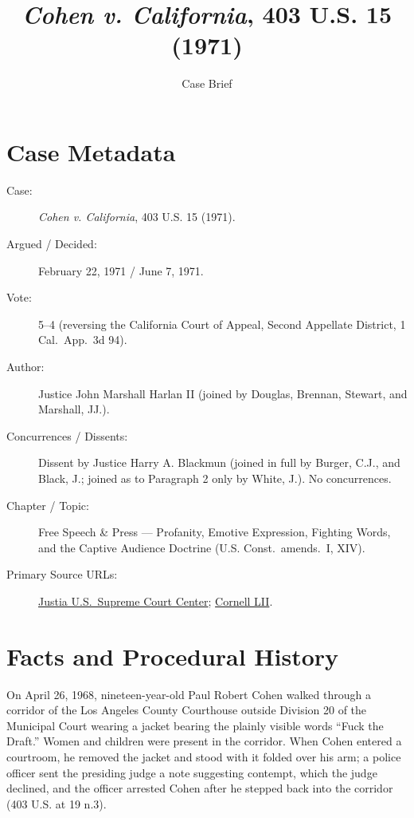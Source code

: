 \documentclass[12pt]{article}
\title{\textit{Cohen v. California}, 403 U.S. 15 (1971)}
\author{Case Brief}
\date{}
\begin{document}
\maketitle


\section{Case Metadata}
\begin{description}
  \item[Case:] \textit{Cohen v. California}, 403 U.S. 15 (1971).
  \item[Argued / Decided:] February 22, 1971 / June 7, 1971.
  \item[Vote:] 5--4 (reversing the California Court of Appeal, Second Appellate District, 1 Cal.\ App.\ 3d 94).
  \item[Author:] Justice John Marshall Harlan II (joined by Douglas, Brennan, Stewart, and Marshall, JJ.).
  \item[Concurrences / Dissents:] Dissent by Justice Harry A. Blackmun (joined in full by Burger, C.J., and Black, J.; joined as to Paragraph 2 only by White, J.). No concurrences.
  \item[Chapter / Topic:] Free Speech \& Press --- Profanity, Emotive Expression, Fighting Words, and the Captive Audience Doctrine (U.S. Const.\ amends.\ I, XIV).
  \item[Primary Source URLs:] \href{https://supreme.justia.com/cases/federal/us/403/15/}{Justia U.S.\ Supreme Court Center}; \href{https://www.law.cornell.edu/supremecourt/text/403/15}{Cornell LII}.
\end{description}

\section{Facts and Procedural History}
On April 26, 1968, nineteen-year-old Paul Robert Cohen walked through a corridor of the Los Angeles County Courthouse outside Division 20 of the Municipal Court wearing a jacket bearing the plainly visible words ``Fuck the Draft.'' Women and children were present in the corridor. When Cohen entered a courtroom, he removed the jacket and stood with it folded over his arm; a police officer sent the presiding judge a note suggesting contempt, which the judge declined, and the officer arrested Cohen after he stepped back into the corridor (403 U.S. at 19 n.3).
\end{document}
